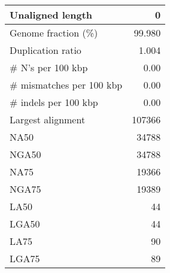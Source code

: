 \documentclass[12pt,a4paper]{article}
\begin{document}
\begin{table}[ht]
\begin{center}
\begin{tabular}{|l*{1}{|r}|}
Unaligned length & 0 \\ \hline
Genome fraction (\%) & 99.980 \\ \hline
Duplication ratio & 1.004 \\ \hline
\# N's per 100 kbp & 0.00 \\ \hline
\# mismatches per 100 kbp & 0.00 \\ \hline
\# indels per 100 kbp & 0.00 \\ \hline
Largest alignment & 107366 \\ \hline
NA50 & 34788 \\ \hline
NGA50 & 34788 \\ \hline
NA75 & 19366 \\ \hline
NGA75 & 19389 \\ \hline
LA50 & 44 \\ \hline
LGA50 & 44 \\ \hline
LA75 & 90 \\ \hline
LGA75 & 89 \\ \hline
\end{tabular}
\end{center}
\end{table}
\end{document}
